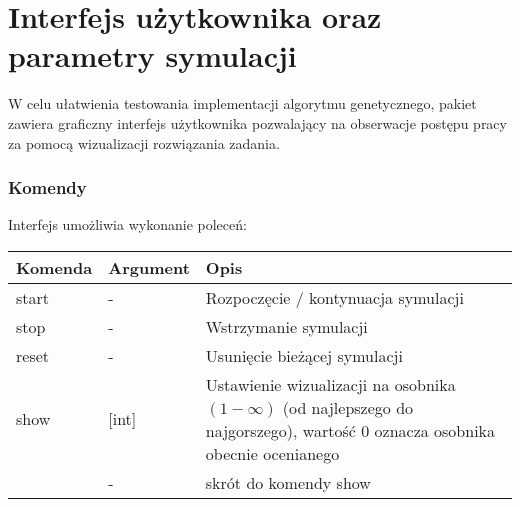 \documentclass[bibtotocnumbered, headsepline,normalheadings,12pt,polish]{scrreprt}
\begin{document}
\section{Interfejs użytkownika oraz parametry symulacji}
W celu ułatwienia testowania implementacji algorytmu genetycznego, pakiet zawiera
graficzny interfejs użytkownika pozwalający na obserwacje postępu pracy za pomocą wizualizacji rozwiązania zadania.

\subsubsection{Komendy}
Interfejs umożliwia wykonanie poleceń:
\\
\begin{tabular}{| l | l || p{10cm}|}
\hline
Komenda & Argument & Opis \\
\hline
\hline
start & - & Rozpoczęcie / kontynuacja symulacji\\
\hline
stop & - & Wstrzymanie symulacji\\
\hline
reset & - & Usunięcie bieżącej symulacji\\
\hline
show & [int] & Ustawienie wizualizacji na osobnika $( 1 - \infty)$ (od najlepszego do najgorszego), wartość $ 0 $ oznacza osobnika obecnie ocenianego\\
\hline
[integer] & - & skrót do komendy show\\
\hline
\end{tabular}
\\
\pagebreak
\end{document}
